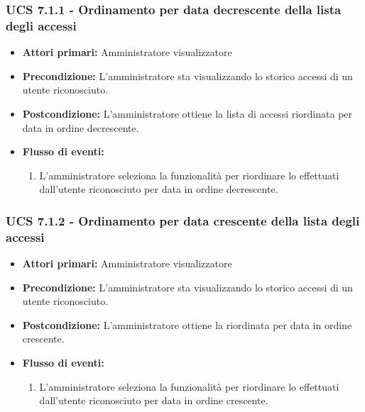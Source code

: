 \subsubsection{UCS 7.1.1 - Ordinamento per data decrescente della lista degli accessi}
\begin{itemize}
	\item \textbf{Attori primari:} Amministratore visualizzatore
	\item \textbf{Precondizione:} L'amministratore sta visualizzando lo storico accessi di un utente riconosciuto.
	\item \textbf{Postcondizione:} L'amministratore ottiene la lista di accessi riordinata per data in ordine decrescente.
	\item \textbf{Flusso di eventi:}
	\begin{enumerate}
		\item L'amministratore seleziona la funzionalità per riordinare lo  effettuati dall'utente riconosciuto per data in ordine decrescente.
	\end{enumerate}
\end{itemize}

\subsubsection{UCS 7.1.2 - Ordinamento per data crescente della lista degli accessi}
\begin{itemize}
	\item \textbf{Attori primari:} Amministratore visualizzatore
	\item \textbf{Precondizione:} L'amministratore sta visualizzando lo storico accessi di un utente riconosciuto.
	\item \textbf{Postcondizione:} L'amministratore ottiene la  riordinata per data in ordine crescente.
	\item \textbf{Flusso di eventi:}
	\begin{enumerate}
		\item L'amministratore seleziona la funzionalità per riordinare lo  effettuati dall'utente riconosciuto per data in ordine crescente.
	\end{enumerate}
\end{itemize}

